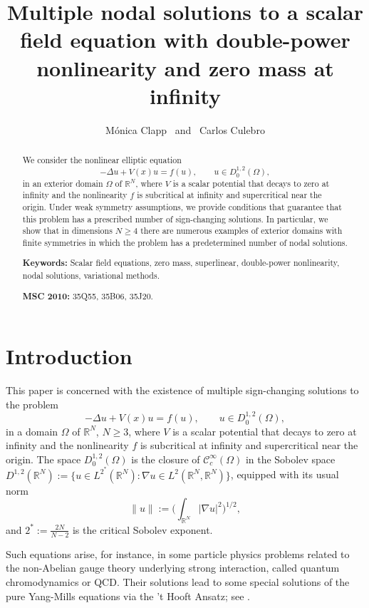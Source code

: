 \documentclass[10pt,letterpaper]{article}
\author{Mónica Clapp  \ and \ Carlos Culebro}
\title{Multiple nodal solutions to a scalar field equation with double-power nonlinearity and zero mass at infinity}
\date{}
\numberwithin{equation}{section}
\def\r{\mathbb{R}}
\def\rn{\mathbb{R}^N}
\def\irn{\int_{\r^N}}
\def\o{\Omega}
\def\cC{\mathcal{C}}
\begin{document}
\maketitle

\begin{abstract}
We consider the nonlinear elliptic equation
\begin{equation*}
-\Delta u + V(x)u = f(u), \qquad u\in D^{1,2}_0(\o),
\end{equation*}
in an exterior domain $\o$ of $\rn$, where $V$ is a scalar potential that decays to zero at infinity and the nonlinearity $f$ is subcritical at infinity and supercritical near the origin. 
Under weak symmetry assumptions, we provide conditions that guarantee that this problem has a prescribed number of sign-changing solutions. In particular, we show that in dimensions $N\geq 4$ there are numerous examples of exterior domains with finite symmetries in which the problem has a predetermined number of nodal solutions.
\smallskip

\textbf{Keywords:} Scalar field equations, zero mass, superlinear, double-power nonlinearity, nodal solutions,
variational methods.
\smallskip

\textbf{MSC 2010:} 35Q55, 35B06, 35J20.
\end{abstract}
	
\section{Introduction}
	
This paper is concerned with the existence of multiple sign-changing solutions to the problem
\begin{equation}
\label{eq:problem}
-\Delta u + V(x)u = f(u), \qquad u\in D^{1,2}_0(\o),
\end{equation}
in a domain $\o$ of $\rn$, $N\geq 3$, where  $V$ is a scalar potential that decays to zero at infinity and the nonlinearity $f$ is subcritical at infinity and supercritical near the origin. The space $D^{1,2}_0(\o)$ is the closure of $\cC_c^\infty(\o)$ in the Sobolev space $D^{1,2}(\rn):=\{u\in L^{2^*}(\rn):\nabla u\in L^2(\rn,\rn)\}$, equipped with its usual norm
\begin{equation} \label{eq:usual norm}
\|u\|:=\Big(\irn|\nabla u|^2\Big)^{1/2},
\end{equation}
and $2^*:=\frac{2N}{N-2}$ is the critical Sobolev exponent.

Such equations arise, for instance, in some particle physics problems related to the non-Abelian gauge theory underlying strong interaction, called quantum chromodynamics or QCD. Their solutions lead to some special solutions of the pure Yang-Mills equations via the 't Hooft Ansatz; see \cite{g}.
\end{document}
